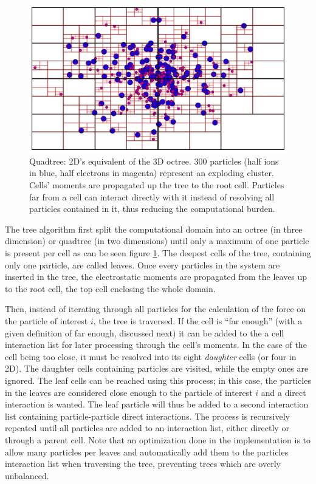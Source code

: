 \begin{figure}
 \centering
 \includegraphics[width=\figurewidth]{figures/quadtree}
 \caption{\label{fig:tree:quadtree}Quadtree: 2D's equivalent of the 3D octree.
          300 particles (half ions in blue, half electrons in magenta) represent
          an exploding cluster. Cells' moments are propagated up the tree to the
          root cell. Particles far from a cell can interact directly with it
          instead of resolving all particles contained in it, thus reducing the
          computational burden.}
\end{figure}


The tree algorithm first split the computational domain into an octree (in
three dimension) or quadtree (in two dimensions) until
only a maximum of one particle is present per cell as can be seen figure
\ref{fig:tree:quadtree}. The deepest cells of the tree, containing only one particle,
are called leaves. Once every particles in the system are inserted in the tree,
the electrostatic moments are propagated from the leaves up to the root cell,
the top cell enclosing the whole domain.

Then, instead of iterating through all particles for the calculation of the
force on the particle of interest $i$, the tree is traversed. If the cell is
``far enough'' (with a given definition of far enough, discussed next) it can
be added to the a cell interaction list for later processing through the cell's
moments. In the case of
the cell being too close, it must be resolved into its  eight \textit{daughter}
cells (or four in 2D). The daughter cells containing particles are visited, while the empty
ones are ignored. The leaf cells can be reached using this process; in this
case, the particles in the leaves are considered close enough to the particle
of interest $i$ and a direct interaction is wanted. The leaf particle will thus
be added to a second interaction list containing particle-particle direct
interactions. The process is recursively repeated until all particles
are added to an interaction list, either directly or through a parent cell.
Note that an optimization done in the
implementation is to allow many particles per leaves and automatically add them
to the particles interaction list when traversing the tree, preventing trees
which are overly unbalanced.

